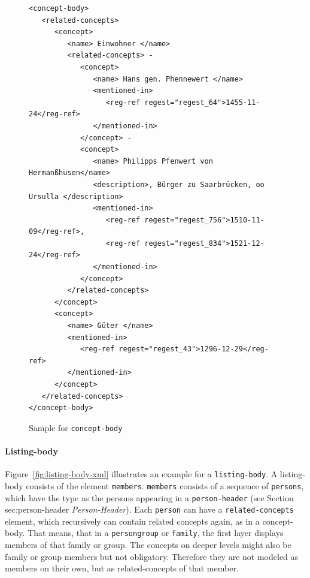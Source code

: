 \begin{figure}[H]
\centering
\begin{verbatim}
<concept-body>
   <related-concepts>
      <concept>
         <name> Einwohner </name>
         <related-concepts> -
            <concept>
               <name> Hans gen. Phennewert </name>
               <mentioned-in>
                  <reg-ref regest="regest_64">1455-11-24</reg-ref>
               </mentioned-in>
            </concept> -
            <concept>
               <name> Philipps Pfenwert von Hermanßhusen</name>
               <description>, Bürger zu Saarbrücken, oo Ursulla </description>
               <mentioned-in>
                  <reg-ref regest="regest_756">1510-11-09</reg-ref>,
                  <reg-ref regest="regest_834">1521-12-24</reg-ref>
               </mentioned-in>
            </concept>
         </related-concepts>
      </concept>
      <concept>
         <name> Güter </name>
         <mentioned-in>
            <reg-ref regest="regest_43">1296-12-29</reg-ref>
         </mentioned-in>
      </concept>
   </related-concepts>
</concept-body>
\end{verbatim}
\caption{Sample for \texttt{concept-body}}
\label{fig:concept-body-xml}
\end{figure}

\paragraph{Listing-body}
Figure~\ref{fig:listing-body-xml} illustrates an example for a
\texttt{listing-body}. A listing-body consists of the element
\texttt{members}. \texttt{members} consists of a sequence of
\texttt{persons}, which have the type as the persons appearing in a
\texttt{person-header} (see Section sec:person-header
\textit{Person-Header}). Each \texttt{person} can have a
\texttt{related-concepts} element, which recursively can contain
related concepts again, as in a concept-body. That means, that in a
\texttt{persongroup} or \texttt{family}, the first layer displays
members of that family or group. The concepts on deeper levels might
also be family or group members but not obligatory. Therefore they are
not modeled as members on their own, but as related-concepts of that
member.

